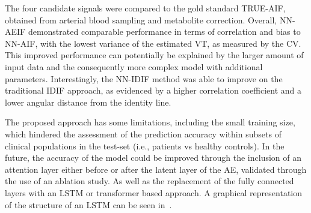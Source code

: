         The four candidate signals were compared to the gold standard TRUE-\gls{AIF}, obtained from arterial blood sampling and metabolite correction. Overall, \gls{NN}-\gls{AE}\gls{IF} demonstrated comparable performance in terms of correlation and bias to \gls{NN}-\gls{AIF}, with the lowest variance of the estimated \gls{VT}, as measured by the \gls{CV}. This improved performance can potentially be explained by the larger amount of input data and the consequently more complex model with additional parameters. Interestingly, the \gls{NN}-\gls{IDIF} method was able to improve on the traditional \gls{IDIF} approach, as evidenced by a higher correlation coefficient and a lower angular distance from the identity line.
        
        The proposed approach has some limitations, including the small training size, which hindered the assessment of the prediction accuracy within subsets of clinical populations in the test-set (i.e., patients vs healthy controls). In the future, the accuracy of the model could be improved through the inclusion of an attention layer either before or after the latent layer of the \gls{AE}, validated through the use of an ablation study. As well as the replacement of the fully connected layers with an \gls{LSTM} or transformer based approach. A graphical representation of the structure of an \gls{LSTM} can be seen in~.
    